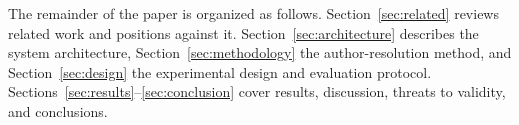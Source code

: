 The remainder of the paper is organized as follows. Section~\ref{sec:related} reviews related work and positions \hammer{} against it. Section~\ref{sec:architecture} describes the system architecture, Section~\ref{sec:methodology} the author-resolution method, and Section~\ref{sec:design} the experimental design and evaluation protocol. Sections~\ref{sec:results}--\ref{sec:conclusion} cover results, discussion, threats to validity, and conclusions.
